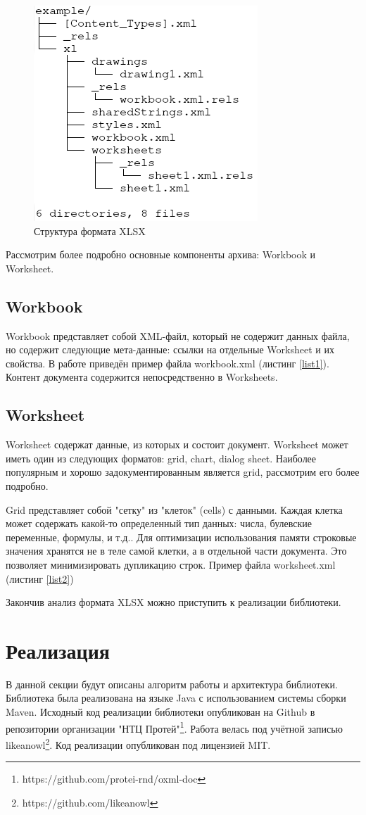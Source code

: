 \documentclass[14pt]{matmex-diploma}
\begin{document}
\begin{figure}
     \centering
     \includegraphics{pics/xlsxstruct.png}
     \caption{Структура формата XLSX}\label{xlsx_tree}
\end{figure}

Рассмотрим более подробно основные компоненты архива: Workbook и Worksheet.
\subsection{Workbook}
Workbook представляет собой XML-файл, который не содержит данных файла, но содержит следующие мета-данные: ссылки на отдельные Worksheet и их свойства. В работе приведён пример файла workbook.xml (листинг \ref{list1}). Контент документа содержится непосредственно в Worksheets.
\subsection{Worksheet}
Worksheet содержат данные, из которых и состоит документ. Worksheet может иметь один из следующих форматов: grid, chart, dialog sheet. Наиболее популярным и хорошо задокументированным является grid, рассмотрим его более подробно. 

Grid представляет собой "сетку" из "клеток" (cells) с данными. Каждая клетка может содержать какой-то определенный тип данных: числа, булевские переменные, формулы, и т.д.. Для оптимизации использования памяти строковые значения хранятся не в теле самой клетки, а в отдельной части документа. Это позволяет минимизировать дупликацию строк. Пример файла worksheet.xml (листинг \ref{list2})

Закончив анализ формата XLSX можно приступить к реализации библиотеки.
\section{Реализация}
В данной секции будут описаны алгоритм работы и архитектура библиотеки. Библиотека была реализована на языке Java с использованием системы сборки Maven. Исходный код реализации библиотеки опубликован на Github в репозитории организации "НТЦ Протей"\footnote{https://github.com/protei-rnd/oxml-doc}. Работа велась под учётной записью likeanowl\footnote{https://github.com/likeanowl}. Код реализации опубликован под лицензией MIT.
\end{document}
